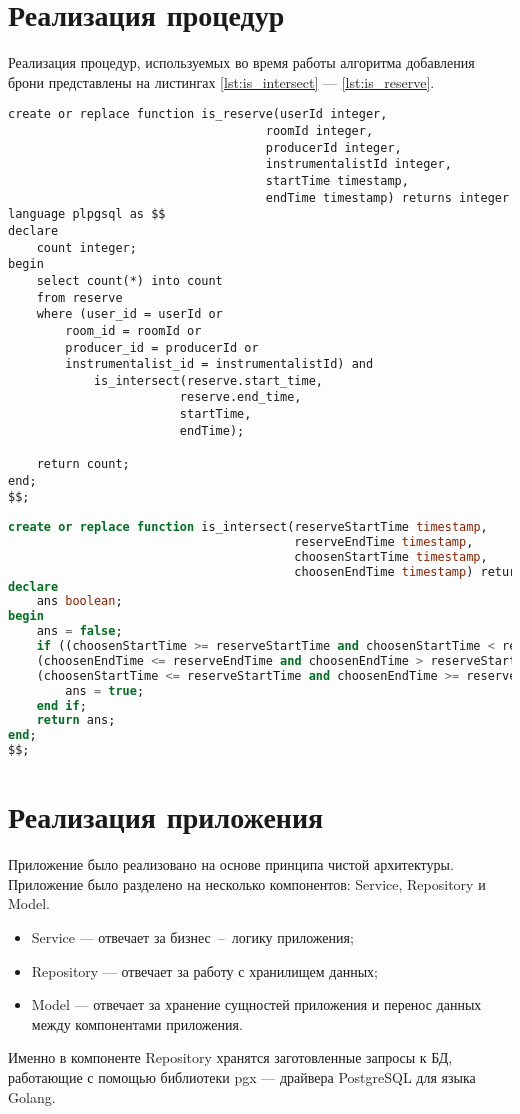 \section{Реализация процедур}
Реализация процедур, используемых во время работы алгоритма добавления брони представлены на листингах \ref{lst:is_intersect} --- \ref{lst:is_reserve}.
\newline
\begin{lstlisting}[label=lst:is_reserve]
create or replace function is_reserve(userId integer,
									roomId integer,
									producerId integer,
									instrumentalistId integer,
									startTime timestamp,
									endTime timestamp) returns integer language plpgsql as $$
declare
	count integer;
begin
	select count(*) into count
	from reserve
	where (user_id = userId or
		room_id = roomId or
		producer_id = producerId or
		instrumentalist_id = instrumentalistId) and 
			is_intersect(reserve.start_time,
						reserve.end_time,
						startTime,
						endTime);

	return count;
end;
$$;
\end{lstlisting}
\newpage

\begin{lstlisting}[language=sql, label=lst:is_intersect]
create or replace function is_intersect(reserveStartTime timestamp, 
										reserveEndTime timestamp,
										choosenStartTime timestamp,
										choosenEndTime timestamp) returns boolean language plpgsql as $$
declare
	ans boolean;
begin
	ans = false;
	if ((choosenStartTime >= reserveStartTime and choosenStartTime < reserveEndTime) or
	(choosenEndTime <= reserveEndTime and choosenEndTime > reserveStartTime) or
	(choosenStartTime <= reserveStartTime and choosenEndTime >= reserveEndTime)) then
		ans = true;
	end if;
	return ans;
end;
$$;
\end{lstlisting}

\section{Реализация приложения}

Приложение было реализовано на основе принципа чистой архитектуры.
Приложение было разделено на несколько компонентов: Service, Repository и Model.
\begin{itemize}
	\item Service --- отвечает за бизнес~--~логику приложения;
	\item Repository --- отвечает за работу с хранилищем данных;
	\item Model --- отвечает за хранение сущностей приложения и перенос данных между компонентами приложения.
\end{itemize}
Именно в компоненте Repository хранятся заготовленные запросы к БД, работающие с помощью библиотеки pgx --- драйвера PostgreSQL для языка Golang. 



